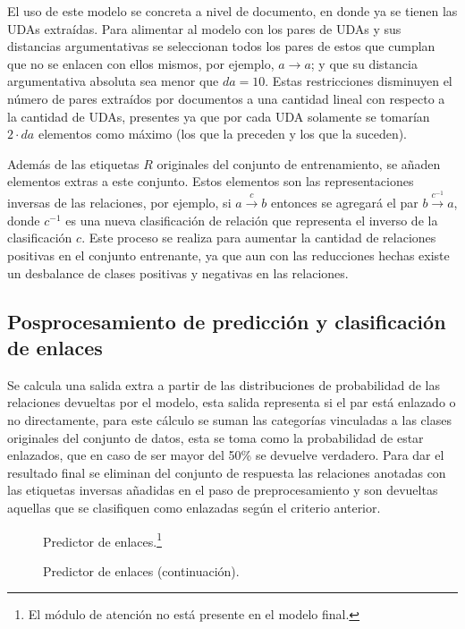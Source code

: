 \documentclass[a4paper,11pt,twocolumn,twoside]{article}
\begin{document}
El uso de este modelo se concreta a nivel de documento, en donde ya se tienen las UDAs extraídas. Para alimentar
al modelo con los pares de UDAs y sus distancias argumentativas se seleccionan todos los pares de estos que cumplan
que no se enlacen con ellos mismos, por ejemplo, $a \rightarrow a$; y que su distancia argumentativa absoluta sea menor 
que $da=10$. Estas restricciones disminuyen el número de pares extraídos por documentos a una cantidad lineal 
con respecto a la cantidad de UDAs, presentes ya que por cada UDA solamente se tomarían $2 \cdot da$ elementos como máximo
(los que la preceden y los que la suceden). 

Además de las etiquetas $R$ originales del conjunto de entrenamiento, se añaden elementos extras a este
conjunto. Estos elementos son las representaciones inversas de las relaciones, por ejemplo, si $a \xrightarrow{c} b$ entonces 
se agregará el par $b \xrightarrow{c^{-1}} a$, donde $c^{-1}$ es una nueva clasificación de relación que representa
el inverso de la clasificación $c$. Este proceso se realiza para aumentar la cantidad de relaciones positivas en el
conjunto entrenante, ya que aun con las reducciones hechas existe un desbalance de clases positivas y negativas en
las relaciones.

\subsection{Posprocesamiento de predicción y clasificación de enlaces}

Se calcula una salida extra a partir de las distribuciones de probabilidad de las relaciones 
devueltas por el modelo, esta salida representa si el par está enlazado o no directamente, para este cálculo se 
suman las categorías vinculadas a las clases originales del conjunto de datos, esta se toma como la probabilidad de estar 
enlazados, que en caso de ser mayor del 50\% se devuelve verdadero. Para dar el resultado final se eliminan del 
conjunto de respuesta las relaciones anotadas con las etiquetas inversas añadidas en el paso de preprocesamiento 
y son devueltas aquellas que se clasifiquen como enlazadas según el criterio anterior.

\begin{figure}[h]
	\centering
	
	\caption{Predictor de enlaces.\footnote{El módulo de atención no está presente en el modelo final.}}
	\label{fig:link_predictor_model1}
\end{figure}
\begin{figure}[h]
	\centering
	
	\caption{Predictor de enlaces (continuación).}
	\label{fig:link_predictor_model2}
\end{figure}
\end{document}
